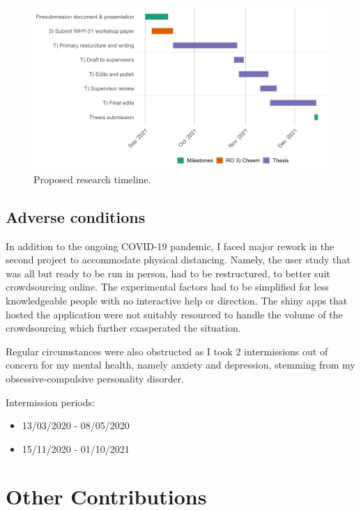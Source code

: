 \documentclass[
  11,
]{article}
\providecommand{\tightlist}{%
  \setlength{\itemsep}{0pt}\setlength{\parskip}{0pt}}
\begin{document}
\begin{figure}

{\centering \includegraphics[width=1\linewidth,]{figures/timeline_post_presubmission} 

}

\caption{Proposed research timeline.}\label{fig:timeline}
\end{figure}

\hypertarget{adverse-conditions}{%
\subsection{Adverse conditions}\label{adverse-conditions}}

In addition to the ongoing COVID-19 pandemic, I faced major rework in the second project to accommodate physical distancing. Namely, the user study that was all but ready to be run in person, had to be restructured, to better suit crowdsourcing online. The experimental factors had to be simplified for less knowledgeable people with no interactive help or direction. The shiny apps that hosted the application were not suitably resourced to handle the volume of the crowdsourcing which further exasperated the situation.

Regular circumstances were also obstructed as I took 2 intermissions out of concern for my mental health, namely anxiety and depression, stemming from my obsessive-compulsive personality disorder.

Intermission periods:

\begin{itemize}
\tightlist
\item
  13/03/2020 - 08/05/2020
\item
  15/11/2020 - 01/10/2021
\end{itemize}

\hypertarget{other-contributions}{%
\section{Other Contributions}\label{other-contributions}}
\end{document}
